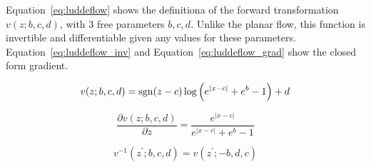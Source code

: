 \documentclass[twoside]{article}
\begin{document}
Equation~\ref{eq:luddeflow} shows the definitiona of the forward transformation
\(v(z; b, c, d)\), with 3 free parameters \(b, c, d\). Unlike the planar
flow, this function is invertible and differentiable given any values for these
parameters. Equation~\ref{eq:luddeflow_inv} and
Equation~\ref{eq:luddeflow_grad} show the closed form gradient.





\begin{equation}
  v(z; b, c, d) = \operatorname{sgn}(z - c) \log \left( e^{\lvert x - c \rvert}
  + e^{b} - 1 \right) + d \label{eq:luddeflow}
\end{equation}

\begin{equation}
  \frac{\partial v(z; b, c, d)}{\partial z} = \frac{e^{\lvert x - c \rvert}}
  {e^{\lvert x - c \rvert} + e^{b} - 1}
  \label{eq:luddeflow_grad}
\end{equation}

\begin{equation}
  v^{-1}(z^\prime; b, c, d) = v(z^\prime; -b, d, c) \label{eq:luddeflow_inv}
\end{equation}
\end{document}
